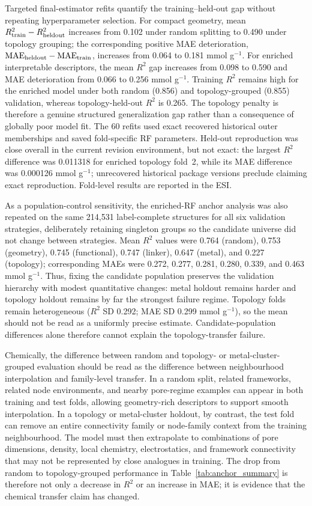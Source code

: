 \documentclass[11pt,a4paper]{article}
\begin{document}
Targeted final-estimator refits quantify the training--held-out gap without repeating hyperparameter selection. For compact geometry, mean $R^2_{\rm train}-R^2_{\rm heldout}$ increases from 0.102 under random splitting to 0.490 under topology grouping; the corresponding positive MAE deterioration, $\mathrm{MAE}_{\rm heldout}-\mathrm{MAE}_{\rm train}$, increases from 0.064 to 0.181 mmol g$^{-1}$. For enriched interpretable descriptors, the mean $R^2$ gap increases from 0.098 to 0.590 and MAE deterioration from 0.066 to 0.256 mmol g$^{-1}$. Training $R^2$ remains high for the enriched model under both random (0.856) and topology-grouped (0.855) validation, whereas topology-held-out $R^2$ is 0.265. The topology penalty is therefore a genuine structured generalization gap rather than a consequence of globally poor model fit. The 60 refits used exact recovered historical outer memberships and saved fold-specific RF parameters. Held-out reproduction was close overall in the current revision environment, but not exact: the largest $R^2$ difference was 0.011318 for enriched topology fold~2, while its MAE difference was 0.000126 mmol g$^{-1}$; unrecovered historical package versions preclude claiming exact reproduction. Fold-level results are reported in the ESI.

As a population-control sensitivity, the enriched-RF anchor analysis was also repeated on the same 214,531 label-complete structures for all six validation strategies, deliberately retaining singleton groups so the candidate universe did not change between strategies. Mean $R^2$ values were 0.764 (random), 0.753 (geometry), 0.745 (functional), 0.747 (linker), 0.647 (metal), and 0.227 (topology); corresponding MAEs were 0.272, 0.277, 0.281, 0.280, 0.339, and 0.463 mmol g$^{-1}$. Thus, fixing the candidate population preserves the validation hierarchy with modest quantitative changes: metal holdout remains harder and topology holdout remains by far the strongest failure regime. Topology folds remain heterogeneous ($R^2$ SD 0.292; MAE SD 0.299 mmol g$^{-1}$), so the mean should not be read as a uniformly precise estimate. Candidate-population differences alone therefore cannot explain the topology-transfer failure.


Chemically, the difference between random and topology- or metal-cluster-grouped evaluation should be read as the difference between neighbourhood interpolation and family-level transfer. In a random split, related frameworks, related node environments, and nearby pore-regime examples can appear in both training and test folds, allowing geometry-rich descriptors to support smooth interpolation. In a topology or metal-cluster holdout, by contrast, the test fold can remove an entire connectivity family or node-family context from the training neighbourhood. The model must then extrapolate to combinations of pore dimensions, density, local chemistry, electrostatics, and framework connectivity that may not be represented by close analogues in training. The drop from random to topology-grouped performance in Table~\ref{tab:anchor_summary} is therefore not only a decrease in $R^2$ or an increase in MAE; it is evidence that the chemical transfer claim has changed.
\end{document}
